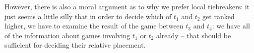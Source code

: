{    However, there is also a moral argument as to why we prefer local tiebreakers: it just seems a little silly that in order to decide which of $t_1$ and $t_2$ get ranked higher, we have to examine the result of the game between $t_3$ and $t_4$: we have all of the information about games involving $t_1$ or $t_2$ already -- that should be sufficient for deciding their relative placement.













}